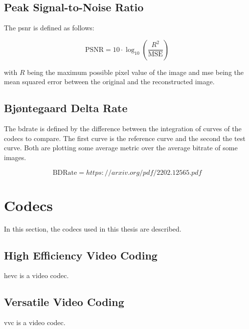 \subsection{Peak Signal-to-Noise Ratio}
\label{subsec:psnr}

The \gls{psnr} is defined as follows:

\begin{equation}
    \text{PSNR} = 10 \cdot \log_{10} \left( \frac{R^2}{\text{MSE}} \right)
    \label{eq:psnr}
\end{equation}

with \(R\) being the maximum possible pixel value of the image and \gls{mse} being the mean squared error between the original and the reconstructed image.

\subsection{Bjøntegaard Delta Rate}
\label{subsec:bdrate}

The \gls{bdrate} is defined by the difference between the integration of curves of the codecs to compare. The first curve is the reference curve and the second the test curve. Both are plotting some average metric over the average bitrate of some images.

\begin{equation}
    \text{BDRate} = https://arxiv.org/pdf/2202.12565.pdf
    \label{eq:bdrate}
\end{equation}

\section{Codecs}
\label{sec:codecs}

In this section, the codecs used in this thesis are described.

\subsection{High Efficiency Video Coding}
\label{subsec:hevc}

\gls{hevc} is a video codec.

\subsection{Versatile Video Coding}
\label{subsec:vvc}

\gls{vvc} is a video codec.
